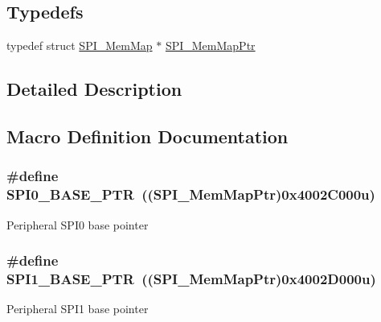 \subsection*{Typedefs}
\begin{DoxyCompactItemize}
\item 
typedef struct \hyperlink{struct_s_p_i___mem_map}{S\+P\+I\+\_\+\+Mem\+Map} $\ast$ \hyperlink{group___s_p_i___peripheral_ga7e4e9921e4d56bdbb10a04e77743ff5e}{S\+P\+I\+\_\+\+Mem\+Map\+Ptr}
\end{DoxyCompactItemize}


\subsection{Detailed Description}


\subsection{Macro Definition Documentation}
\hypertarget{group___s_p_i___peripheral_ga851f64a97b5919c1f99a34db5918b3b4}{}
\subsubsection[{S\+P\+I0\+\_\+\+B\+A\+S\+E\+\_\+\+P\+T\+R}]{\setlength{\rightskip}{0pt plus 5cm}\#define S\+P\+I0\+\_\+\+B\+A\+S\+E\+\_\+\+P\+T\+R~(({\bf S\+P\+I\+\_\+\+Mem\+Map\+Ptr})0x4002\+C000u)}\label{group___s_p_i___peripheral_ga851f64a97b5919c1f99a34db5918b3b4}
Peripheral S\+P\+I0 base pointer \hypertarget{group___s_p_i___peripheral_gae28fd789e0602a32076c1c13ca39f5af}{}
\subsubsection[{S\+P\+I1\+\_\+\+B\+A\+S\+E\+\_\+\+P\+T\+R}]{\setlength{\rightskip}{0pt plus 5cm}\#define S\+P\+I1\+\_\+\+B\+A\+S\+E\+\_\+\+P\+T\+R~(({\bf S\+P\+I\+\_\+\+Mem\+Map\+Ptr})0x4002\+D000u)}\label{group___s_p_i___peripheral_gae28fd789e0602a32076c1c13ca39f5af}
Peripheral S\+P\+I1 base pointer \hypertarget{group___s_p_i___peripheral_ga78714a4b750aa56fc56d1d223a560069}{}
